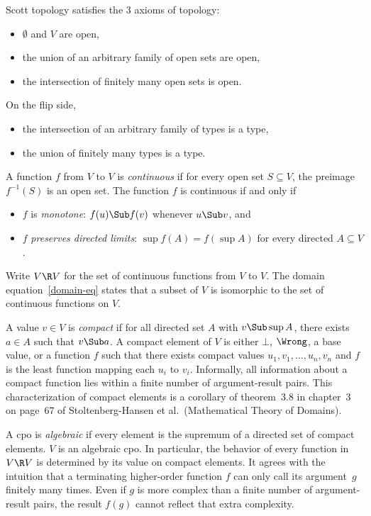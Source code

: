 \documentclass{amsart}
\begin{document}
Scott topology satisfies the 3 axioms of topology:
\begin{itemize}
\item $\emptyset$ and $V$ are open,
\item the union of an arbitrary family of open sets are open,
\item the intersection of finitely many open sets is open.
\end{itemize}

On the flip side,
\begin{itemize}
\item the intersection of an arbitrary family of types is a type,
\item the union of finitely many types is a type.
\end{itemize}

A function $f$ from $V$ to $V$ is \emph{continuous} if for every
open set $S\subseteq V$, the preimage $f^{-1}(S)$ is an open set.
The function $f$ is continuous if and only if
\begin{itemize}
\item $f$ is \emph{monotone}: $f(u)\Sub f(v)$ whenever $u\Sub v$,
and
\item $f$ \emph{preserves directed limits}: $\sup f(A) = f(\sup
A)$ for every directed $A\subseteq V$.
\end{itemize}
Write $V\R V$ for the set of continuous functions from $V$ to
$V$. The domain equation~\eqref{domain-eq} states that a subset
of $V$ is isomorphic to the set of continuous functions on $V$.

A value $v\in V$ is \emph{compact} if for all directed set $A$
with $v\Sub\sup A$, there exists $a\in A$ such that $v\Sub a$. A
compact element of $V$ is either $\bot$, $\Wrong$, a base value,
or a function $f$ such that there exists compact values
$u_1,v_1,\ldots,u_n,v_n$ and $f$ is the least function mapping
each $u_i$ to $v_i$. Informally, all information about a compact
function lies within a finite number of argument-result pairs.
This characterization of compact elements is a corollary of
theorem~3.8 in chapter~3 on page~67 of Stoltenberg-Hansen et al.\
(Mathematical Theory of Domains).

A cpo is \emph{algebraic} if every element is the supremum of a
directed set of compact elements. $V$ is an algebraic cpo. In
particular, the behavior of every function in $V\R V$ is
determined by its value on compact elements. It agrees with the
intuition that a terminating higher-order function $f$ can only
call its argument~$g$ finitely many times. Even if $g$ is more
complex than a finite number of argument-result pairs, the result
$f(g)$ cannot reflect that extra complexity.
\end{document}
